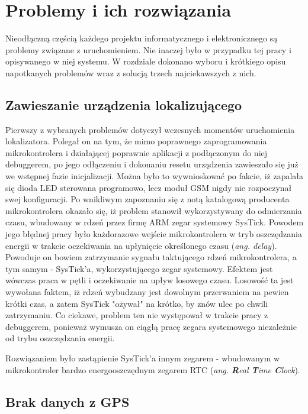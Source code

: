 \chapter{Problemy i ich rozwiązania}
\label{problems_and_solutions}

Nieodłączną częścią każdego projektu informatycznego i elektronicznego są problemy związane z uruchomieniem. Nie inaczej było w przypadku tej pracy i opisywanego w niej systemu. W rozdziale dokonano wyboru i krótkiego opisu napotkanych problemów wraz z solucją trzech najciekawszych z nich.


\section{Zawieszanie urządzenia lokalizującego}

Pierwszy z wybranych problemów dotyczył wczesnych momentów uruchomienia lokalizatora. Polegał on na tym, że mimo poprawnego zaprogramowania mikrokontrolera i działającej poprawnie aplikacji z podłączonym do niej debuggerem, po jego odłączeniu i dokonaniu resetu urządzenia zawieszało się już we wstępnej fazie inicjalizacji. Można było to wywnioskować po fakcie, iż zapalała się dioda LED sterowana programowo, lecz moduł GSM nigdy nie rozpoczynał swej konfiguracji. Po wnikliwym zapoznaniu się z notą katalogową producenta mikrokontrolera okazało się, iż problem stanowił wykorzystywany do odmierzania czasu, wbudowany w rdzeń przez firmę ARM zegar systemowy SysTick. Powodem jego błędnej pracy było każdorazowe wejście mikrokontrolera w tryb oszczędzania energii w trakcie oczekiwania na upłynięcie określonego czasu (\textit{ang. delay}). Powoduje on bowiem zatrzymanie sygnału taktującego rdzeń mikrokontrolera, a tym samym - SysTick'a, wykorzystującego zegar systemowy. Efektem jest wówczas praca w pętli i oczekiwanie na upływ losowego czasu. Losowość ta jest wywołana faktem, iż rdzeń wybudzany jest dowolnym przerwaniem na pewien krótki czas, a zatem SysTick "ożywał" na krótko, by znów ulec po chwili zatrzymaniu. Co ciekawe, problem ten nie występował w trakcie pracy z debuggerem, ponieważ wymusza on ciągłą pracę zegara systemowego niezależnie od trybu oszczędzania energii. 

Rozwiązaniem było zastąpienie SysTick'a innym zegarem - wbudowanym w mikrokontroler bardzo energooszczędnym zegarem RTC (\textit{ang. \textbf{R}eal \textbf{T}ime \textbf{C}lock}).

\section{Brak danych z GPS}

